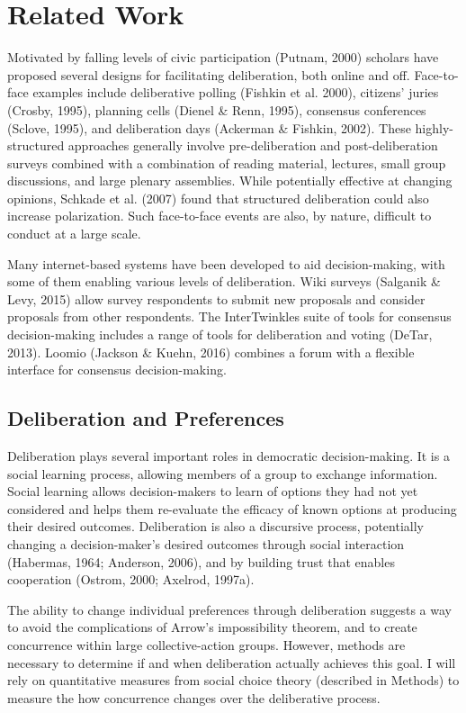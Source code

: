 \section{Related Work}
Motivated by falling levels of civic participation (Putnam, 2000) scholars have proposed several designs for facilitating deliberation, both online and off. Face-to-face examples include deliberative polling (Fishkin et al. 2000), citizens’ juries (Crosby, 1995), planning cells (Dienel \& Renn, 1995), consensus conferences (Sclove, 1995), and deliberation days (Ackerman \& Fishkin, 2002). These highly-structured approaches generally involve pre-deliberation and post-deliberation surveys combined with a combination of reading material, lectures, small group discussions, and large plenary assemblies. While potentially effective at changing opinions, Schkade et al. (2007) found that structured deliberation could also increase polarization. Such face-to-face events are also, by nature, difficult to conduct at a large scale. 

Many internet-based systems have been developed to aid decision-making, with some of them enabling various levels of deliberation. Wiki surveys (Salganik \& Levy, 2015) allow survey respondents to submit new proposals and consider proposals from other respondents. The InterTwinkles suite of tools for consensus decision-making includes a range of tools for deliberation and voting (DeTar, 2013). Loomio (Jackson \& Kuehn, 2016) combines a forum with a flexible interface for consensus decision-making.

\subsection{Deliberation and Preferences}
Deliberation plays several important roles in democratic decision-making. It is a social learning process, allowing members of a group to exchange information. Social learning allows decision-makers to learn of options they had not yet considered and helps them re-evaluate the efficacy of known options at producing their desired outcomes. Deliberation is also a discursive process, potentially changing a decision-maker’s desired outcomes through social interaction (Habermas, 1964; Anderson, 2006), and by building trust that enables cooperation (Ostrom, 2000; Axelrod, 1997a).

The ability to change individual preferences through deliberation suggests a way to avoid the complications of Arrow’s impossibility theorem, and to create concurrence within large collective-action groups. However, methods are necessary to determine if and when deliberation actually achieves this goal. I will rely on quantitative measures from social choice theory (described in Methods) to measure the how concurrence changes over the deliberative process.

